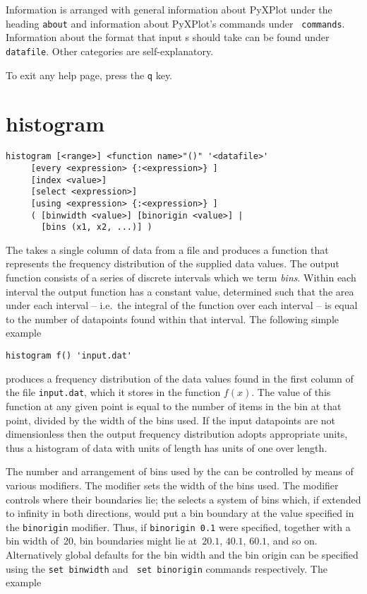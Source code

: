 Information is arranged with general information about PyXPlot under the
heading {\tt about} and information about PyXPlot's commands under {\tt
commands}.  Information about the format that input \datafile s should take can
be found under {\tt datafile}.  Other categories are self-explanatory.

To exit any help page, press the {\tt q} key.


\section{histogram}

\begin{verbatim}
histogram [<range>] <function name>"()" '<datafile>'
     [every <expression> {:<expression>} ]
     [index <value>]
     [select <expression>]
     [using <expression> {:<expression>} ]
     ( [binwidth <value>] [binorigin <value>] |
       [bins (x1, x2, ...)] )
\end{verbatim}

The  takes a single column of data from a file and produces
a function that represents the frequency distribution of the supplied data
values. The output function consists of a series of discrete intervals which we
term {\it bins}. Within each interval the output function has a constant value,
determined such that the area under each interval -- i.e.\ the integral of the
function over each interval -- is equal to the number of datapoints found
within that interval.  The following simple example

\begin{verbatim}
histogram f() 'input.dat'
\end{verbatim}

\noindent produces a frequency distribution of the data values found in the
first column of the file {\tt input.dat}, which it stores in the function
$f(x)$. The value of this function at any given point is equal to the number of
items in the bin at that point, divided by the width of the bins used. If the
input datapoints are not dimensionless then the output frequency distribution
adopts appropriate units, thus a histogram of data with units of length has
units of one over length.

The number and arrangement of bins used by the  can be
controlled by means of various modifiers.  The  modifier sets
the width of the bins used. The  modifier controls where
their boundaries lie; the  selects a system of bins which,
if extended to infinity in both directions, would put a bin boundary at the
value specified in the {\tt binorigin} modifier. Thus, if {\tt binorigin 0.1}
were specified, together with a bin width of~20, bin boundaries might lie
at~$20.1$, $40.1$, $60.1$, and so on. Alternatively global defaults for the bin
width and the bin origin can be specified using the {\tt set binwidth} and {\tt
set binorigin} commands respectively. The example

